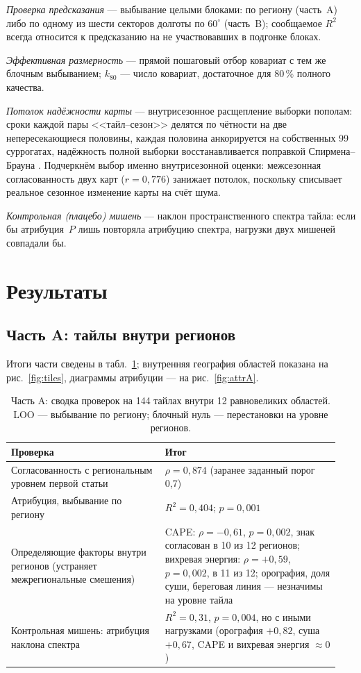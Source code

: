 \documentclass[11pt,a4paper]{article}
\begin{document}
\emph{Проверка предсказания} --- выбывание целыми блоками: по региону (часть~A) либо по одному из шести секторов долготы по $60^\circ$ (часть~B); сообщаемое $R^2$ всегда относится к предсказанию на не участвовавших в подгонке блоках.

\emph{Эффективная размерность} --- прямой пошаговый отбор ковариат с тем же блочным выбыванием; $k_{80}$ --- число ковариат, достаточное для 80\,\% полного качества.

\emph{Потолок надёжности карты} --- внутрисезонное расщепление выборки пополам: сроки каждой пары <<тайл--сезон>> делятся по чётности на две непересекающиеся половины, каждая половина анкорируется на собственных 99 суррогатах, надёжность полной выборки восстанавливается поправкой Спирмена--Брауна \cite{Spearman1910,Brown1910}. Подчеркнём выбор именно внутрисезонной оценки: межсезонная согласованность двух карт ($r=0{,}776$) занижает потолок, поскольку списывает реальное сезонное изменение карты на счёт шума.

\emph{Контрольная (плацебо) мишень} --- наклон пространственного спектра тайла: если бы атрибуция~$P$ лишь повторяла атрибуцию спектра, нагрузки двух мишеней совпадали бы.

\section{Результаты}
\label{sec:results}

\subsection{Часть A: тайлы внутри регионов}
\label{sec:armA}

Итоги части сведены в табл.~\ref{tab:armA}; внутренняя география областей показана на рис.~\ref{fig:tiles}, диаграммы атрибуции --- на рис.~\ref{fig:attrA}.

\begin{table}[t]
\centering
\caption{Часть A: сводка проверок на 144 тайлах внутри 12 равновеликих областей. LOO --- выбывание по региону; блочный нуль --- перестановки на уровне регионов.}
\label{tab:armA}
\small
\begin{tabular}{@{}p{0.44\linewidth}p{0.50\linewidth}@{}}
\toprule
Проверка & Итог\\
\midrule
Согласованность с региональным уровнем первой статьи & $\rho=0{,}874$ (заранее заданный порог 0,7)\\
Атрибуция, выбывание по региону & $R^2=0{,}404$; $p=0{,}001$\\
Определяющие факторы внутри регионов (устраняет межрегиональные смешения) & CAPE: $\rho=-0{,}61$, $p=0{,}002$, знак согласован в 10 из 12 регионов; вихревая энергия: $\rho=+0{,}59$, $p=0{,}002$, в 11 из 12; орография, доля суши, береговая линия --- незначимы на уровне тайла\\
Контрольная мишень: атрибуция наклона спектра & $R^2=0{,}31$, $p=0{,}004$, но с иными нагрузками (орография $+0{,}82$, суша $+0{,}67$, CAPE и вихревая энергия $\approx0$)\\
\bottomrule
\end{tabular}
\end{table}
\end{document}
